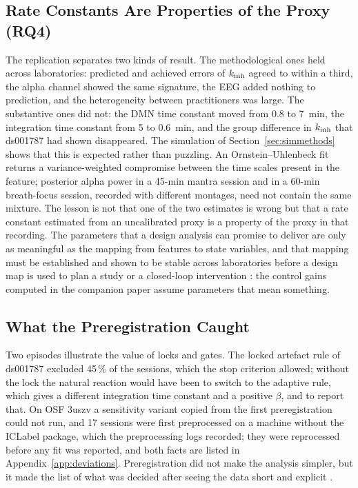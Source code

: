 \subsection{Rate Constants Are Properties of the Proxy (RQ4)}
The replication separates two kinds of result. The methodological ones held across laboratories: predicted and achieved errors of $k_{\mathrm{inh}}$ agreed to within a third, the alpha channel showed the same signature, the EEG added nothing to prediction, and the heterogeneity between practitioners was large. The substantive ones did not: the DMN time constant moved from 0.8 to 7~min, the integration time constant from 5 to 0.6~min, and the group difference in $k_{\mathrm{inh}}$ that ds001787 had shown disappeared. The simulation of Section~\ref{sec:simmethods} shows that this is expected rather than puzzling. An Ornstein--Uhlenbeck fit returns a variance-weighted compromise between the time scales present in the feature; posterior alpha power in a 45-min mantra session and in a 60-min breath-focus session, recorded with different montages, need not contain the same mixture. The lesson is not that one of the two estimates is wrong but that a rate constant estimated from an uncalibrated proxy is a property of the proxy in that recording. The parameters that a design analysis can promise to deliver are only as meaningful as the mapping from features to state variables, and that mapping must be established and shown to be stable across laboratories before a design map is used to plan a study or a closed-loop intervention \cite{Sitaram2017,Ros2020}: the control gains computed in the companion paper assume parameters that mean something.

\subsection{What the Preregistration Caught}
Two episodes illustrate the value of locks and gates. The locked artefact rule of ds001787 excluded 45\,\% of the sessions, which the stop criterion allowed; without the lock the natural reaction would have been to switch to the adaptive rule, which gives a different integration time constant and a positive $\beta$, and to report that. On OSF 3uszv a sensitivity variant copied from the first preregistration could not run, and 17 sessions were first preprocessed on a machine without the ICLabel package, which the preprocessing logs recorded; they were reprocessed before any fit was reported, and both facts are listed in Appendix~\ref{app:deviations}. Preregistration did not make the analysis simpler, but it made the list of what was decided after seeing the data short and explicit \cite{Nosek2018}.

